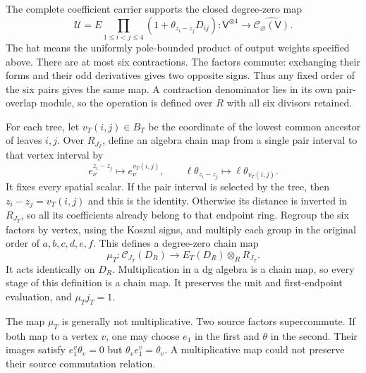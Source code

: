 The complete coefficient carrier supports the closed degree-zero map
\begin{equation}\label{fp:eq:four-universal-state}
 \mathcal U=E\prod_{1\le i<j\le4}
       (1+\theta_{z_i-z_j}D_{ij})
 :\mathsf V^{\otimes4}\longrightarrow
       \widehat{\mathcal C_\varnothing(\mathsf V)}.
\end{equation}
The hat means the uniformly pole-bounded product of output weights
specified above.  There are at most six contractions.  The factors
commute: exchanging their forms and their odd derivatives gives two
opposite signs.  Thus any fixed order of the six pairs gives the
same map.  A contraction denominator lies in its own pair-overlap
module, so the operation is defined over \(R\) with all six
divisors retained.

For each tree, let \(v_T(i,j)\in B_T\) be the coordinate
of the lowest common ancestor of leaves \(i,j\).  Over \(R_{J_T}\),
define an algebra chain map from a single pair interval to that vertex
interval by
\[
 e_\nu^{z_i-z_j}\longmapsto e_\nu^{v_T(i,j)},\qquad
 \ell\theta_{z_i-z_j}\longmapsto\ell\theta_{v_T(i,j)}.
\]
It fixes every spatial scalar.  If the pair interval is selected by
the tree, then \(z_i-z_j=v_T(i,j)\) and this is the identity.
Otherwise its distance is inverted in \(R_{J_T}\), so all its
coefficients already belong to that endpoint ring.
Regroup the six factors by vertex, using the Koszul signs, and
multiply each group in the original order of \(a,b,c,d,e,f\).
This defines a degree-zero chain map
\begin{equation}\label{fp:eq:four-grouping-map}
 \mu_T:\mathcal C_{J_T}(D_R)\longrightarrow
             E_T(D_R)\otimes_R R_{J_T}.
\end{equation}
It acts identically on \(D_R\).  Multiplication in a dg algebra
is a chain map, so every stage of this definition is a chain map.
It preserves the unit and first-endpoint evaluation, and
\(\mu_Tj_T=1\).

The map \(\mu_T\) is generally not multiplicative.  Two
source factors supercommute.  If both map to a vertex \(v\),
one may choose \(e_1\) in the first and \(\theta\) in
the second.  Their images satisfy \(e_1^v\theta_v=0\) but
\(\theta_ve_1^v=\theta_v\).  A multiplicative map could
not preserve their source commutation relation.

